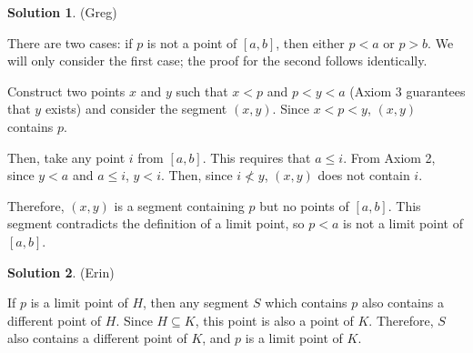 \documentclass{article}
\theoremstyle{definition}
\newtheorem{solution}{Solution}
\begin{document}
\begin{solution} %
(Greg)

There are two cases: if $p$ is not a point of $[a, b]$, then either $p < a$ or $p > b$.
We will only consider the first case; the proof for the second follows identically.

Construct two points $x$ and $y$ such that $x < p$ and $p < y < a$ (Axiom 3 guarantees that $y$ exists) and consider the segment $(x, y)$.
Since $x < p < y$, $(x, y)$ contains $p$.

Then, take any point $i$ from $[a, b]$.
This requires that $a \leq i$.
From Axiom 2, since $y < a$ and $a \leq i$, $y < i$.
Then, since $i \nless y$, $(x, y)$ does not contain $i$.

Therefore, $(x, y)$ is a segment containing $p$ but no points of $[a, b]$.
This segment contradicts the definition of a limit point, so $p < a$ is not a limit point of $[a, b]$.
\end{solution}

\begin{solution} %
(Erin)

If $p$ is a limit point of $H$, then any segment $S$ which contains $p$ also contains a different point of $H$.
Since $H \subseteq K$, this point is also a point of $K$.
Therefore, $S$ also contains a different point of $K$, and $p$ is a limit point of $K$.
\end{solution}
\end{document}
